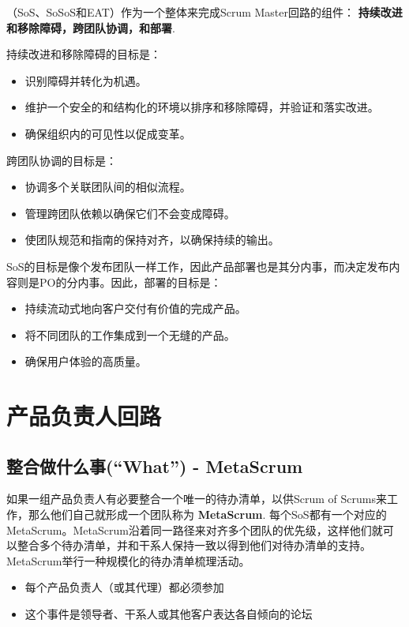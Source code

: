 \documentclass[12pt,a4paper,parskip=full]{scrartcl}
\begin{document}
\begin{CJK*}{UTF8}{gbsn}
（SoS、SoSoS和EAT）作为一个整体来完成Scrum Master回路的组件： \textbf{持续改进和移除障碍，跨团队协调，和部署}.

持续改进和移除障碍的目标是：

\begin{itemize}
\item 识别障碍并转化为机遇。
\item 维护一个安全的和结构化的环境以排序和移除障碍，并验证和落实改进。
\item 确保组织内的可见性以促成变革。
\end{itemize}

跨团队协调的目标是：
\begin{itemize}
\item 协调多个关联团队间的相似流程。
\item 管理跨团队依赖以确保它们不会变成障碍。
\item 使团队规范和指南的保持对齐，以确保持续的输出。
\end{itemize}

SoS的目标是像个发布团队一样工作，因此产品部署也是其分内事，而决定发布内容则是PO的分内事。因此，部署的目标是：
\begin{itemize}
\item 持续流动式地向客户交付有价值的完成产品。
\item 将不同团队的工作集成到一个无缝的产品。
\item 确保用户体验的高质量。
\end{itemize}

\section{产品负责人回路}
\subsection{整合做什么事(“What”) - MetaScrum}
如果一组产品负责人有必要整合一个唯一的待办清单，以供Scrum of Scrums来工作，那么他们自己就形成一个团队称为 \textbf{MetaScrum}.
每个SoS都有一个对应的MetaScrum。MetaScrum沿着同一路径来对齐多个团队的优先级，这样他们就可以整合多个待办清单，并和干系人保持一致以得到他们对待办清单的支持。MetaScrum举行一种规模化的待办清单梳理活动。

\begin{itemize}
\item 每个产品负责人（或其代理）都必须参加
\item 这个事件是领导者、干系人或其他客户表达各自倾向的论坛
\end{itemize}


\end{CJK*}
\end{document}
